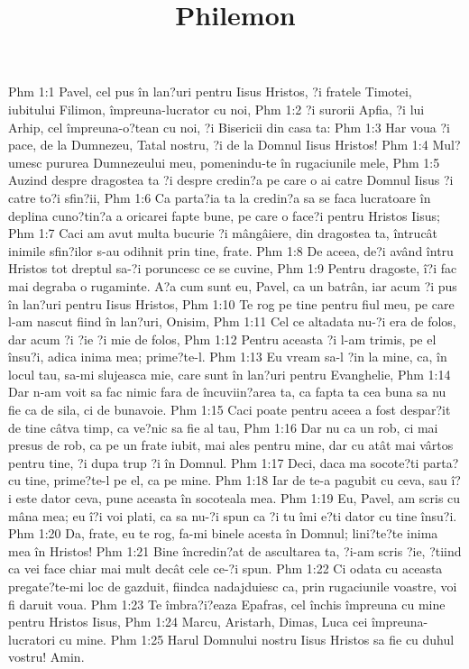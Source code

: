 

\title{Philemon}

Phm 1:1  Pavel, cel pus în lan?uri pentru Iisus Hristos, ?i fratele Timotei, iubitului Filimon, împreuna-lucrator cu noi,
Phm 1:2  ?i surorii Apfia, ?i lui Arhip, cel împreuna-o?tean cu noi, ?i Bisericii din casa ta:
Phm 1:3  Har voua ?i pace, de la Dumnezeu, Tatal nostru, ?i de la Domnul Iisus Hristos!
Phm 1:4  Mul?umesc pururea Dumnezeului meu, pomenindu-te în rugaciunile mele,
Phm 1:5  Auzind despre dragostea ta ?i despre credin?a pe care o ai catre Domnul Iisus ?i catre to?i sfin?ii,
Phm 1:6  Ca parta?ia ta la credin?a sa se faca lucratoare în deplina cuno?tin?a a oricarei fapte bune, pe care o face?i pentru Hristos Iisus;
Phm 1:7  Caci am avut multa bucurie ?i mângâiere, din dragostea ta, întrucât inimile sfin?ilor s-au odihnit prin tine, frate.
Phm 1:8  De aceea, de?i având întru Hristos tot dreptul sa-?i poruncesc ce se cuvine,
Phm 1:9  Pentru dragoste, î?i fac mai degraba o rugaminte. A?a cum sunt eu, Pavel, ca un batrân, iar acum ?i pus în lan?uri pentru Iisus Hristos,
Phm 1:10  Te rog pe tine pentru fiul meu, pe care l-am nascut fiind în lan?uri, Onisim,
Phm 1:11  Cel ce altadata nu-?i era de folos, dar acum ?i ?ie ?i mie de folos,
Phm 1:12  Pentru aceasta ?i l-am trimis, pe el însu?i, adica inima mea; prime?te-l.
Phm 1:13  Eu vream sa-l ?in la mine, ca, în locul tau, sa-mi slujeasca mie, care sunt în lan?uri pentru Evanghelie,
Phm 1:14  Dar n-am voit sa fac nimic fara de încuviin?area ta, ca fapta ta cea buna sa nu fie ca de sila, ci de bunavoie.
Phm 1:15  Caci poate pentru aceea a fost despar?it de tine câtva timp, ca ve?nic sa fie al tau,
Phm 1:16  Dar nu ca un rob, ci mai presus de rob, ca pe un frate iubit, mai ales pentru mine, dar cu atât mai vârtos pentru tine, ?i dupa trup ?i în Domnul.
Phm 1:17  Deci, daca ma socote?ti parta? cu tine, prime?te-l pe el, ca pe mine.
Phm 1:18  Iar de te-a pagubit cu ceva, sau î?i este dator ceva, pune aceasta în socoteala mea.
Phm 1:19  Eu, Pavel, am scris cu mâna mea; eu î?i voi plati, ca sa nu-?i spun ca ?i tu îmi e?ti dator cu tine însu?i.
Phm 1:20  Da, frate, eu te rog, fa-mi binele acesta în Domnul; lini?te?te inima mea în Hristos!
Phm 1:21  Bine încredin?at de ascultarea ta, ?i-am scris ?ie, ?tiind ca vei face chiar mai mult decât cele ce-?i spun.
Phm 1:22  Ci odata cu aceasta pregate?te-mi loc de gazduit, fiindca nadajduiesc ca, prin rugaciunile voastre, voi fi daruit voua.
Phm 1:23  Te îmbra?i?eaza Epafras, cel închis împreuna cu mine pentru Hristos Iisus,
Phm 1:24  Marcu, Aristarh, Dimas, Luca cei împreuna-lucratori cu mine.
Phm 1:25  Harul Domnului nostru Iisus Hristos sa fie cu duhul vostru! Amin.


